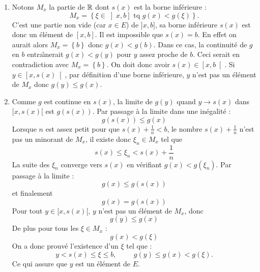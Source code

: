 \begin{enumerate}
\begin{enumerate}
  \item Notons $M_x$ la partie de $\mathbb{R}$ dont $s(x)$ est la borne inférieure :
\begin{displaymath}
 M_{x} = \left\lbrace  \xi \in \left] x,b \right] \text{ tq } g(x) < g(\xi ) \right\rbrace.
\end{displaymath}
C'est une partie non vide (car $x\in E$) de $]x,b]$, sa borne inf{\'e}rieure $s(x)$ est donc un {\'e}l{\'e}ment de $[x,b] $.\newline
Il est impossible que $s(x)=b$. En effet on aurait alors $M_{x}= \left\lbrace b \right\rbrace$ donc $g(x) < g(b)$. Dans ce cas, la continuit{\'e} de $g$ en $b$ entra\^{\i }nerait $g(x)<g(y)$ pour $y$ assez proche de $b$. Ceci serait en contradiction avec $M_{x}=\left\lbrace b\right\rbrace $.\newline
On doit donc avoir $s(x) \in \left[ x,b \right[$.
\newline Si $y\in \left[ x,s(x) \right[$, par définition d'une borne inférieure, $y$ n'est pas un {\'e}l{\'e}ment de $M_{x}$ donc $g(y)\leq g(x)$.

  \item Comme $g$ est continue en $s(x)$, la limite de $g(y)$ quand $y \rightarrow s(x)$ dans $[x,s(x)[ $ est $g(s(x))$. Par passage {\`a} la limite dans une in{\'e}galit{\'e} :
\begin{displaymath}
 g(s(x))\leq g(x)
\end{displaymath}
Lorsque $n$ est assez petit pour que $s(x)+\frac{1}{n}<b$, le nombre $s(x)+ \frac{1}{n}$ n'est pas un minorant de $M_{x}$, il existe donc $\xi_{n}\in M_x$ tel que
\[s(x) \leq \xi_{n}<s(x)+\frac{1}{n}\]
La suite des $\xi _{n}$ converge vers $s(x)$ en v{\'e}rifiant $g(x)<g(\xi _{n})$. Par passage {\`a} la limite :
\begin{displaymath}
g(x)\leq g(s(x)) 
\end{displaymath}
et finalement 
\begin{displaymath}
 g(x)=g(s(x))
\end{displaymath}
Pour tout $y\in [x,s(x)[$, $y$ n'est pas un élément de $M_x$, donc
\begin{displaymath}
 g(y)\leq g(x)
\end{displaymath}
 De plus pour tous les $\xi\in M_x$ :
\begin{displaymath}
 g(x)<g(\xi )
\end{displaymath}
On a donc prouvé l'existence d'un $\xi$ tel que :
\begin{displaymath}
 y<s(x)\leq \xi \leq b, \hspace{1cm}
g(y)\leq g(x) < g(\xi).
\end{displaymath}
Ce qui assure que $y$ est un {\'e}l{\'e}ment de $E$.
\end{enumerate}
\end{enumerate}
